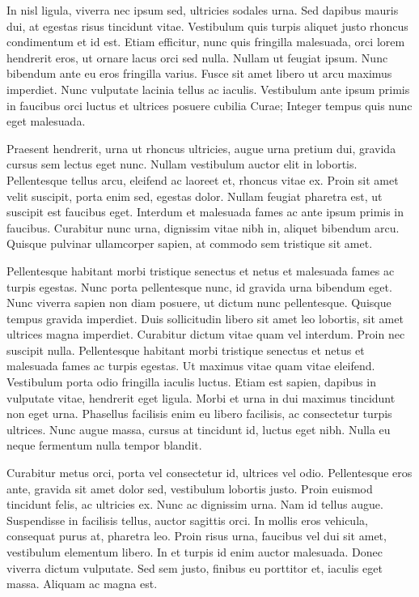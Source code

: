 In nisl ligula, viverra nec ipsum sed, ultricies sodales urna. Sed dapibus mauris dui, at egestas risus tincidunt vitae. Vestibulum quis turpis aliquet justo rhoncus condimentum et id est. Etiam efficitur, nunc quis fringilla malesuada, orci lorem hendrerit eros, ut ornare lacus orci sed nulla. Nullam ut feugiat ipsum. Nunc bibendum ante eu eros fringilla varius. Fusce sit amet libero ut arcu maximus imperdiet. Nunc vulputate lacinia tellus ac iaculis. Vestibulum ante ipsum primis in faucibus orci luctus et ultrices posuere cubilia Curae; Integer tempus quis nunc eget malesuada.

Praesent hendrerit, urna ut rhoncus ultricies, augue urna pretium dui, gravida cursus sem lectus eget nunc. Nullam vestibulum auctor elit in lobortis. Pellentesque tellus arcu, eleifend ac laoreet et, rhoncus vitae ex. Proin sit amet velit suscipit, porta enim sed, egestas dolor. Nullam feugiat pharetra est, ut suscipit est faucibus eget. Interdum et malesuada fames ac ante ipsum primis in faucibus. Curabitur nunc urna, dignissim vitae nibh in, aliquet bibendum arcu. Quisque pulvinar ullamcorper sapien, at commodo sem tristique sit amet.

Pellentesque habitant morbi tristique senectus et netus et malesuada fames ac turpis egestas. Nunc porta pellentesque nunc, id gravida urna bibendum eget. Nunc viverra sapien non diam posuere, ut dictum nunc pellentesque. Quisque tempus gravida imperdiet. Duis sollicitudin libero sit amet leo lobortis, sit amet ultrices magna imperdiet. Curabitur dictum vitae quam vel interdum. Proin nec suscipit nulla. Pellentesque habitant morbi tristique senectus et netus et malesuada fames ac turpis egestas. Ut maximus vitae quam vitae eleifend. Vestibulum porta odio fringilla iaculis luctus. Etiam est sapien, dapibus in vulputate vitae, hendrerit eget ligula. Morbi et urna in dui maximus tincidunt non eget urna. Phasellus facilisis enim eu libero facilisis, ac consectetur turpis ultrices. Nunc augue massa, cursus at tincidunt id, luctus eget nibh. Nulla eu neque fermentum nulla tempor blandit.

Curabitur metus orci, porta vel consectetur id, ultrices vel odio. Pellentesque eros ante, gravida sit amet dolor sed, vestibulum lobortis justo. Proin euismod tincidunt felis, ac ultricies ex. Nunc ac dignissim urna. Nam id tellus augue. Suspendisse in facilisis tellus, auctor sagittis orci. In mollis eros vehicula, consequat purus at, pharetra leo. Proin risus urna, faucibus vel dui sit amet, vestibulum elementum libero. In et turpis id enim auctor malesuada. Donec viverra dictum vulputate. Sed sem justo, finibus eu porttitor et, iaculis eget massa. Aliquam ac magna est.

